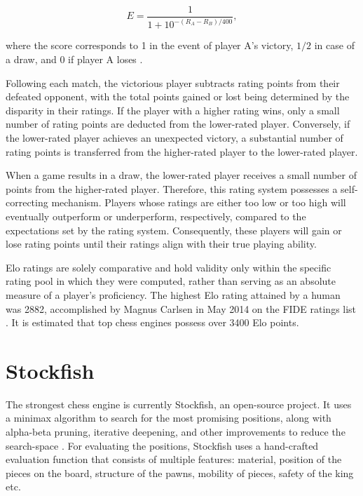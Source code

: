 \begin{equation}
    E=\frac{1}{1+10^{-(R_A-R_B)/400}},
\end{equation}

where the score corresponds to 1 in the event of player A's victory, $1/2$ in case of a draw, and 0 if player A loses \cite{glickman1999rating}.

Following each match, the victorious player subtracts rating points from their defeated opponent, with the total points gained or lost being determined by the disparity in their ratings. If the player with a higher rating wins, only a small number of rating points are deducted from the lower-rated player. Conversely, if the lower-rated player achieves an unexpected victory, a substantial number of rating points is transferred from the higher-rated player to the lower-rated player.

When a game results in a draw, the lower-rated player receives a small number of points from the higher-rated player. Therefore, this rating system possesses a self-correcting mechanism. Players whose ratings are either too low or too high will eventually outperform or underperform, respectively, compared to the expectations set by the rating system. Consequently, these players will gain or lose rating points until their ratings align with their true playing ability.

Elo ratings are solely comparative and hold validity only within the specific rating pool in which they were computed, rather than serving as an absolute measure of a player's proficiency. The highest Elo rating attained by a human was 2882, accomplished by Magnus Carlsen in May 2014 on the FIDE ratings list \cite{fide-ratings-May2014}. It is estimated that top chess engines possess over 3400 Elo points.

\section{Stockfish}
\label{sec:ch3sec3}

The strongest chess engine is currently Stockfish, an open-source project. It uses a minimax algorithm to search for the most promising positions, along with alpha-beta pruning, iterative deepening, and other improvements to reduce the search-space \cite{maharaj2022chess}. For evaluating the positions, Stockfish uses a hand-crafted evaluation function that consists of multiple features: material, position of the pieces on the board, structure of the pawns, mobility of pieces, safety of the king etc. \cite{lai2015giraffe}

